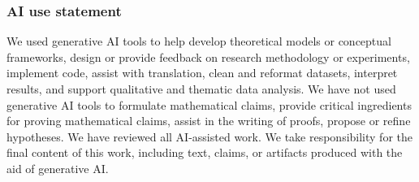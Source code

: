 \subsubsection*{AI use statement}
We used generative AI tools to help develop theoretical models or conceptual frameworks, design or provide feedback on research methodology or experiments, implement code, assist with translation, clean and reformat datasets, interpret results, and support qualitative and thematic data analysis. We have not used generative AI tools to formulate mathematical claims, provide critical ingredients for proving mathematical claims, assist in the writing of proofs, propose or refine hypotheses. We have reviewed all AI-assisted work. We take responsibility for the final content of this work, including text, claims, or artifacts produced with the aid of generative AI.

